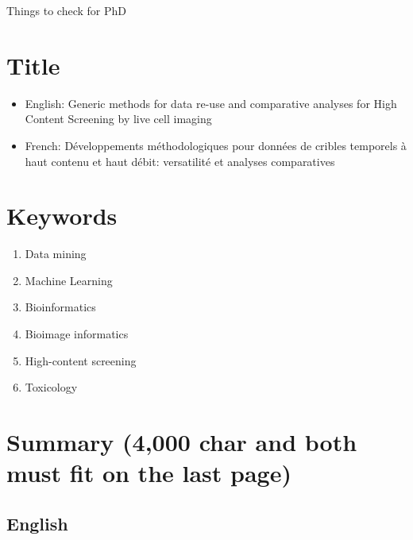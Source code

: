 \documentclass[12pt]{article}
\begin{document}
Things to check for PhD
\section{Title}
\begin{itemize}
\item English: Generic methods for data re-use and comparative analyses for High
Content Screening by live cell imaging
\item French: Développements méthodologiques pour données de cribles temporels à haut contenu et haut débit: versatilité et analyses comparatives
\end{itemize}
\section{Keywords}
\begin{enumerate}
\item Data mining
\item Machine Learning
\item Bioinformatics

\item Bioimage informatics
\item High-content screening
\item Toxicology

\end{enumerate}


\section{Summary (4,000 char and both must fit on the last page)}
\subsection{English}
\end{document}

